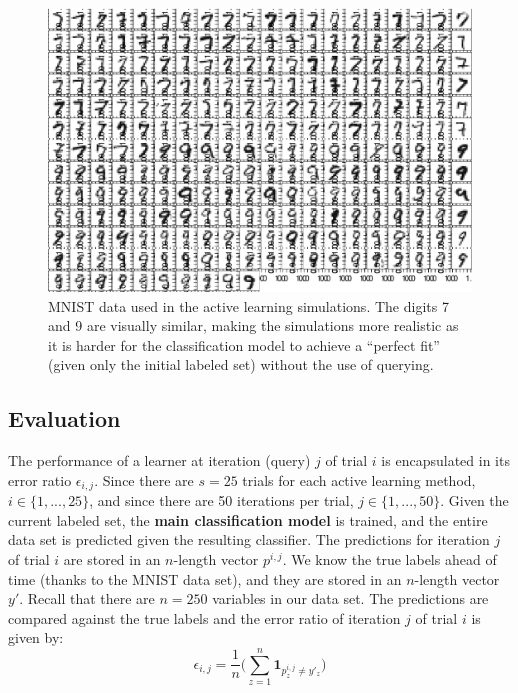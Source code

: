 \tablespacing
\begin{figure}[H]
	\begin{center}
		\includegraphics[width=1\linewidth]{ch-al/figures/data.pdf}
		\caption[MNIST data used in the active learning simulations.]{MNIST 
		data used in the active learning
		simulations. The digits 7 and 9 are visually similar, making 
		the simulations more realistic as it is harder for the classification 
		model to achieve a ``perfect fit'' (given only the initial labeled set) 
		without the use of querying.}
		\label{fig:al:simulations:data}
	\end{center}
\end{figure}
\bodyspacing

\subsection{Evaluation}
\label{sec:al:simulation:evaluation}
The performance of a learner at iteration (query) $j$ of trial $i$ is 
encapsulated in its error ratio $\epsilon_{i, j}$. Since there are $s=25$ 
trials 
for each active learning method, $i \in \{1,...,25\}$, and since there are 50 
iterations per trial, $j \in \{1,...,50\}$. 
Given the current labeled set, the 
\textbf{main classification model} is trained, and the entire data set is 
predicted given the resulting classifier. The predictions for iteration $j$ of 
trial $i$ are stored in an $n$-length vector $p^{i,j}$. 
We know the true labels ahead of time (thanks to the MNIST data set), and they 
are stored in an $n$-length vector $y'$. Recall that there are $n = 250$ 
variables in our data set. The predictions are compared against 
the true labels and the error ratio of iteration $j$ of trial $i$ is given by:
$$\epsilon_{i,j} = \frac{1}{n} \bigg( \sum\limits_{z=1}^{n} 
\textbf{1}_{p^{i,j}_z \neq y'_z} \bigg)$$

